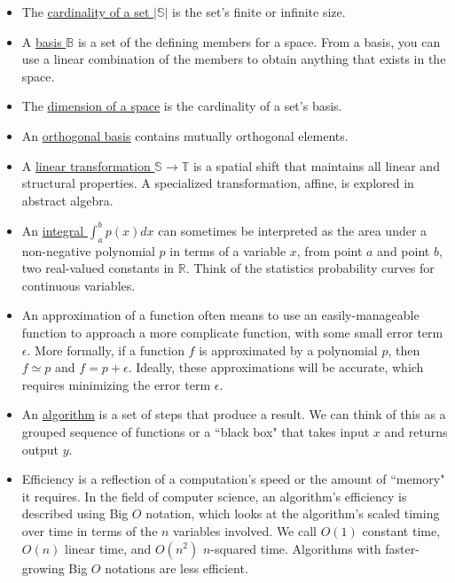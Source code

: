 \documentclass[letterpaper, 12pt]{article}
\begin{document}
\begin{itemize}
	\vspace*{-4mm}
	\item The \underline{cardinality of a set $|\mathbb{S}|$} is the set's finite or infinite size. 
					
	\vspace*{-3mm}
	\item A \underline{basis $\mathbb{B}$} is a set of the defining members for a space. From a basis, you can use a linear combination of the members to obtain anything that exists in the space. 
	
	\vspace*{-4mm}
	\item The \underline{dimension of a space} is the cardinality of a set's basis.
				
	\vspace*{-3mm}
	\item An \underline{orthogonal basis} contains mutually orthogonal elements.
				
	\vspace*{-3mm}
	\item A \underline{linear transformation $\mathbb{S} \rightarrow \mathbb{T}$} is a spatial shift that maintains all linear and structural properties. A specialized transformation, affine, is explored in abstract algebra.
				
	\vspace*{-3mm}
	\item An \underline{integral $\int _a ^b p(x) dx$} can sometimes be interpreted as the area under a non-negative polynomial $p$ in terms of a variable $x$, from point $a$ and point $b$, two real-valued constants in $\mathbb{R}$. Think of the statistics probability curves for continuous variables.
				
	\vspace*{-3mm}
	\item An approximation of a function often means to use an easily-manageable function to approach a more complicate function, with some small error term $\epsilon$. More formally, if a function $f$ is approximated by a polynomial $p$, then $f \simeq p$ and $f = p + \epsilon$. Ideally, these approximations will be accurate, which requires minimizing the error term $\epsilon$.
				
	\vspace*{-3mm}
	\item An \underline{algorithm} is a set of steps that produce a result. We can think of this as a grouped sequence of functions or a ``black box" that takes input $x$ and returns output $y$.
				
	\vspace*{-3mm}
	\item Efficiency is a reflection of a computation's speed or the amount of ``memory" it requires. In the field of computer science, an algorithm's efficiency is described using Big $O$ notation, which looks at the algorithm's scaled timing over time in terms of the $n$ variables involved. We call $O(1)$ constant time, $O(n)$ linear time, and $O(n^2)$ $n$-squared time. Algorithms with faster-growing Big $O$ notations are less efficient.
\end{itemize}
\end{document}
